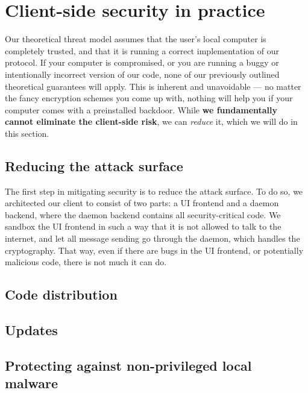 \section{Client-side security in practice}

Our theoretical threat model assumes that the user's local computer is completely trusted, and that it is running a correct implementation of our protocol. If your computer is compromised, or you are running a buggy or intentionally incorrect version of our code, none of our previously outlined theoretical guarantees will apply. This is inherent and unavoidable — no matter the fancy encryption schemes you come up with, nothing will help you if your computer comes with a preinstalled backdoor. While \textbf{we fundamentally cannot eliminate the client-side risk}, we can \textit{reduce} it, which we will do in this section.

\subsection{Reducing the attack surface}

The first step in mitigating security is to reduce the attack surface. To do so, we architected our client to consist of two parts: a UI frontend and a daemon backend, where the daemon backend contains all security-critical code. We sandbox the UI frontend in such a way that it is not allowed to talk to the internet, and let all message sending go through the daemon, which handles the cryptography. That way, even if there are bugs in the UI frontend, or potentially malicious code, there is not much it can do.


\subsection{Code distribution}



\subsection{Updates}


\subsection{Protecting against non-privileged local malware}

